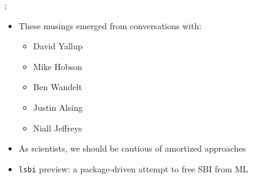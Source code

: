 \documentclass[aspectratio=169]{beamer}
\begin{document}
\begin{frame}
{    };
    \begin{itemize}
        \item These musings emerged from conversations with:
            \begin{itemize}
                \item David Yallup
                \item Mike Hobson
                \item Ben Wandelt
                \item Justin Alsing
                \item Niall Jeffreys
            \end{itemize}
        \item As scientists, we should be cautious of amortized approaches
        \item \texttt{lsbi} preview: a package-driven attempt to free SBI from ML
    \end{itemize}
\end{frame}
\end{document}
